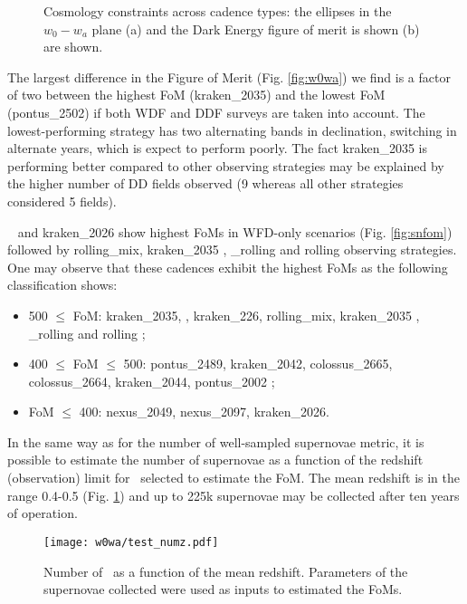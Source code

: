 \begin{figure}[!htbp]
  \begin{center}
    \caption{Cosmology constraints across cadence types: the ellipses in the $w_0-w_a$ plane (a) and the Dark Energy figure of merit is shown (b) are shown. }
    \end{center}
\end{figure}
The largest difference in the Figure of Merit (Fig. \ref{fig:w0wa}) we find is a factor of two between the highest FoM (kraken\_2035) and the lowest FoM (pontus\_2502) if both WDF and DDF surveys are taken into account. The lowest-performing strategy has two alternating bands in declination, switching in alternate years, which is expect to perform poorly. The fact kraken\_2035 is performing better compared to other observing strategies may be explained by the higher number of DD fields observed (9 whereas all other strategies considered 5 fields).

\altsched~ and kraken\_2026 show highest FoMs in WFD-only scenarios (Fig. \ref{fig:snfom}) followed by rolling\_mix, kraken\_2035 , \altsched\_rolling and rolling observing strategies. One may observe that these cadences exhibit the highest FoMs as the following classification shows:
\begin{itemize}
\item{500 $\leq$ FoM}: kraken\_2035, \altsched, kraken\_226, rolling\_mix, kraken\_2035 , \altsched\_rolling and rolling ;
\item{400 $\leq$ FoM $\leq$ 500}: pontus\_2489, kraken\_2042, colossus\_2665, colossus\_2664, kraken\_2044, pontus\_2002 ;
\item{FoM $\leq$ 400}: nexus\_2049, nexus\_2097, kraken\_2026.
\end{itemize}

In the same way as for the number of well-sampled supernovae metric, it is possible to estimate the number of supernovae as a function of the  redshift (observation) limit for \sne~selected to estimate the FoM. The mean redshift is in the range 0.4-0.5 (Fig. \ref{fig:w0wazlim}) and up to 225k supernovae may be collected after ten years of operation.

\begin{figure}[!htbp]
  \begin{center}
    \texttt{[image: w0wa/test\_numz.pdf]}
    \caption{Number of \sne~as a function of the mean redshift. Parameters of the supernovae collected were used as inputs to estimated the FoMs.}
    \label{fig:w0wazlim}
  \end{center}
\end{figure}

